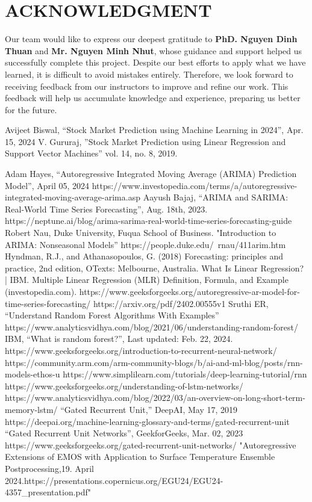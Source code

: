 \documentclass{ieeeojies}
\begin{document}
 \section{ACKNOWLEDGMENT}
   Our team would like to express our deepest gratitude to \textbf{PhD. Nguyen Dinh Thuan}  and \textbf{Mr. Nguyen Minh Nhut}, whose guidance and support helped us successfully complete this project. Despite our best efforts to apply what we have learned, it is difficult to avoid mistakes entirely. Therefore, we look forward to receiving feedback from our instructors to improve and refine our work. This feedback will help us accumulate knowledge and experience, preparing us better for the future.
\begin{thebibliography}{00}
 Avijeet Biswal, “Stock Market Prediction using Machine Learning in 2024”, Apr. 15, 2024
 V. Gururaj, ”Stock Market Prediction using Linear Regression and Support Vector Machines” vol. 14, no. 8, 2019.

 Adam Hayes, “Autoregressive Integrated Moving Average (ARIMA) Prediction Model”, April 05, 2024
https://www.investopedia.com/terms/a/autoregressive-integrated-moving-average-arima.asp
 Aayush Bajaj, “ARIMA and SARIMA: Real-World Time Series Forecasting”, Aug. 18th, 2023.
https://neptune.ai/blog/arima-sarima-real-world-time-series-forecasting-guide
 Robert Nau, Duke University, Fuqua School of Business. "Introduction to ARIMA: Nonseasonal Models”
https://people.duke.edu/~rnau/411arim.htm
 Hyndman, R.J., and Athanasopoulos, G. (2018) Forecasting: principles and practice, 2nd edition, OTexts: Melbourne, Australia. 
 What Is Linear Regression? | IBM.
 Multiple Linear Regression (MLR) Definition, Formula, and Example (investopedia.com).
 https://www.geeksforgeeks.org/autoregressive-ar-model-for-time-series-forecasting/
https://arxiv.org/pdf/2402.00555v1
 Sruthi ER, “Understand Random Forest Algorithms With Examples”
https://www.analyticsvidhya.com/blog/2021/06/understanding-random-forest/
 IBM, “What is random forest?”, Last updated: Feb. 22, 2024.
 https://www.geeksforgeeks.org/introduction-to-recurrent-neural-network/
 https://community.arm.com/arm-community-blogs/b/ai-and-ml-blog/posts/rnn-models-ethos-u
  https://www.simplilearn.com/tutorials/deep-learning-tutorial/rnn
https://www.geeksforgeeks.org/understanding-of-lstm-networks/
https://www.analyticsvidhya.com/blog/2022/03/an-overview-on-long-short-term-memory-lstm/
“Gated Recurrent Unit,” DeepAI, May 17, 2019 https://deepai.org/machine-learning-glossary-and-terms/gated-recurrent-unit
“Gated Recurrent Unit Networks”, GeekforGeeks, Mar. 02, 2023 https://www.geeksforgeeks.org/gated-recurrent-unit-networks/
 "Autoregressive Extensions of EMOS with
Application to Surface Temperature Ensemble
Postprocessing,19. April 2024.https://presentations.copernicus.org/EGU24/EGU24-4357_presentation.pdf"

\end{thebibliography}


\EOD
\end{document}
